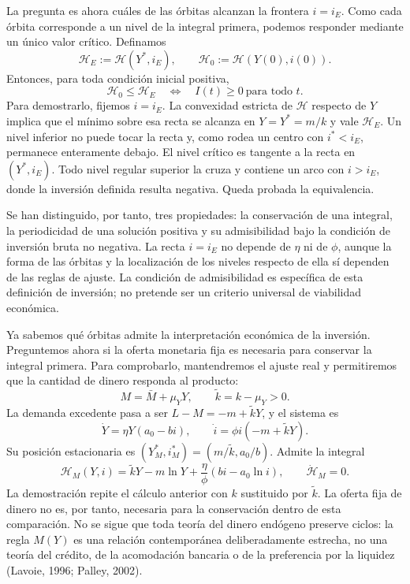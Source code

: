 \documentclass[10.5pt,twoside]{article}
\newcounter{rsec}
\newcommand{\rsection}{%
  \refstepcounter{rsec}%
  \par\vspace{1.35em}%
  \begin{center}\fontsize{14}{16}\selectfont\Roman{rsec}\end{center}%
  \vspace{0.35em}%
}
\begin{document}
La pregunta es ahora cuáles de las órbitas alcanzan la frontera $i=i_E$. Como cada órbita corresponde a un nivel de la integral primera, podemos responder mediante un único valor crítico. Definamos
\[
 \mathord{\mathcal H_E:=\mathcal H(Y^*,i_E),\qquad
 \mathcal H_0:=\mathcal H(Y(0),i(0)).}
\]
Entonces, para toda condición inicial positiva,
\[
 \boxed{\mathcal H_0\leq\mathcal H_E
 \quad\Longleftrightarrow\quad I(t)\geq0\ \text{para todo }t.}
\]
Para demostrarlo, fijemos $i=i_E$. La convexidad estricta de $\mathcal H$ respecto de $Y$ implica que el mínimo sobre esa recta se alcanza en $Y=Y^*=m/k$ y vale $\mathcal H_E$. Un nivel inferior no puede tocar la recta y, como rodea un centro con $i^*<i_E$, permanece enteramente debajo. El nivel crítico es tangente a la recta en $(Y^*,i_E)$. Todo nivel regular superior la cruza y contiene un arco con $i>i_E$, donde la inversión definida resulta negativa. Queda probada la equivalencia.

Se han distinguido, por tanto, tres propiedades: la conservación de una integral, la periodicidad de una solución positiva y su admisibilidad bajo la condición de inversión bruta no negativa. La recta $i=i_E$ no depende de $\eta$ ni de $\phi$, aunque la forma de las órbitas y la localización de los niveles respecto de ella sí dependen de las reglas de ajuste. La condición de admisibilidad es específica de esta definición de inversión; no pretende ser un criterio universal de viabilidad económica.

\rsection
Ya sabemos qué órbitas admite la interpretación económica de la inversión. Preguntemos ahora si la oferta monetaria fija es necesaria para conservar la integral primera. Para comprobarlo, mantendremos el ajuste real y permitiremos que la cantidad de dinero responda al producto:
\[
 M=\bar M+\mu_Y Y,\qquad \widetilde k=k-\mu_Y>0.
\]
La demanda excedente pasa a ser $L-M=-m+\widetilde kY$, y el sistema es
\[
 \mathord{\dot Y=\eta Y(a_0-bi),\qquad
 \dot i=\phi i(-m+\widetilde kY).}
\]
Su posición estacionaria es $(Y_M^*,i_M^*)=(m/\widetilde k,a_0/b)$. Admite la integral
\[
 \mathord{\mathcal H_M(Y,i)=\widetilde kY-m\ln Y
 +\frac\eta\phi(bi-a_0\ln i),\qquad \dot{\mathcal H}_M=0.}
\]
La demostración repite el cálculo anterior con $k$ sustituido por $\widetilde k$. La oferta fija de dinero no es, por tanto, necesaria para la conservación dentro de esta comparación. No se sigue que toda teoría del dinero endógeno preserve ciclos: la regla $M(Y)$ es una relación contemporánea deliberadamente estrecha, no una teoría del crédito, de la acomodación bancaria o de la preferencia por la liquidez (Lavoie, 1996; Palley, 2002).
\end{document}
